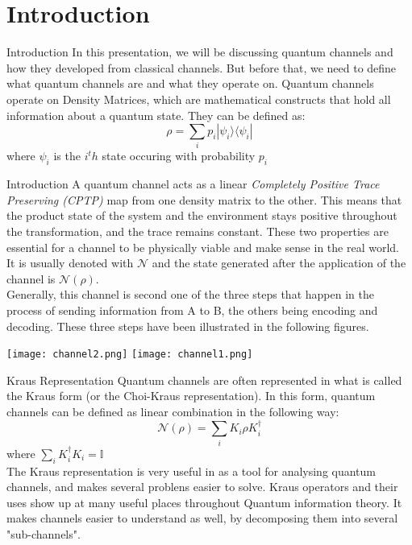 \section{Introduction}

\begin{frame}{Introduction}
    In this presentation, we will be discussing quantum channels and how they developed from classical channels. But before that, we need to define what quantum channels
    are and what they operate on.
    Quantum channels operate on Density Matrices, which are mathematical constructs that hold all information about a quantum state. They can be defined as:
    \begin{equation}
        \rho = \sum_{i}p_i | \psi_i \rangle \langle \psi_i |   
    \end{equation}
    where $\psi_i$ is the $i^th$ state occuring with probability $p_i$
\end{frame}

\begin{frame}{Introduction}
    A quantum channel acts as a linear \textit{Completely Positive Trace Preserving (CPTP)} map from one density matrix to the other. This means that the product state
    of the system and the environment stays positive throughout the transformation, and the trace remains constant. These two properties are essential for a channel to
    be physically viable and make sense in the real world.\\
    It is usually denoted with $\mathcal{N}$ and the state generated after the application of the channel is $\mathcal{N} (\rho)$.\\
    Generally, this channel is second one of the three steps that happen in the process of sending information from A to B, the others being encoding and decoding.
    These three steps have been illustrated in the following figures.
\end{frame}

\begin{frame}
    \texttt{[image: channel2.png]}
    \texttt{[image: channel1.png]}
\end{frame}

\begin{frame}{Kraus Representation}
    Quantum channels are often represented in what is called the Kraus form (or the Choi-Kraus representation). In this form, quantum channels can be defined
    as linear combination in the following way:
    \begin{equation}
        \mathcal{N}(\rho) = \sum_i K_i \rho K_i^\dagger 
    \end{equation}
    where $\sum_i K_i^\dagger K_i = \mathbb{I} $\\
    The Kraus representation is very useful in as a tool for analysing quantum channels, and makes several problens easier to solve. Kraus operators and their
    uses show up at many useful places throughout Quantum information theory. It makes channels easier to understand as well, by decomposing them into several
    "sub-channels".
\end{frame}

